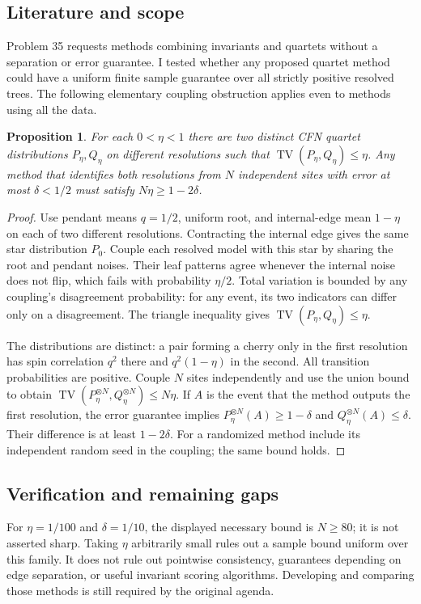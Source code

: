 \documentclass[11pt]{article}
\newtheorem{proposition}{Proposition}
\begin{document}
\subsection{Literature and scope}
Problem 35 requests methods combining invariants and quartets without a separation or error guarantee. I tested whether any proposed quartet method could have a uniform finite sample guarantee over all strictly positive resolved trees. The following elementary coupling obstruction applies even to methods using all the data.
\begin{proposition}
For each $0<\eta<1$ there are two distinct CFN quartet distributions $P_\eta,Q_\eta$ on different resolutions such that $\operatorname{TV}(P_\eta,Q_\eta)\le\eta$. Any method that identifies both resolutions from $N$ independent sites with error at most $\delta<1/2$ must satisfy $N\eta\ge1-2\delta$.
\end{proposition}
\begin{proof}
Use pendant means $q=1/2$, uniform root, and internal-edge mean $1-\eta$ on each of two different resolutions. Contracting the internal edge gives the same star distribution $P_0$. Couple each resolved model with this star by sharing the root and pendant noises. Their leaf patterns agree whenever the internal noise does not flip, which fails with probability $\eta/2$. Total variation is bounded by any coupling's disagreement probability: for any event, its two indicators can differ only on a disagreement. The triangle inequality gives $\operatorname{TV}(P_\eta,Q_\eta)\le\eta$.

The distributions are distinct: a pair forming a cherry only in the first resolution has spin correlation $q^2$ there and $q^2(1-\eta)$ in the second. All transition probabilities are positive. Couple $N$ sites independently and use the union bound to obtain $\operatorname{TV}(P_\eta^{\otimes N},Q_\eta^{\otimes N})\le N\eta$. If $A$ is the event that the method outputs the first resolution, the error guarantee implies $P_\eta^{\otimes N}(A)\ge1-\delta$ and $Q_\eta^{\otimes N}(A)\le\delta$. Their difference is at least $1-2\delta$. For a randomized method include its independent random seed in the coupling; the same bound holds.
\end{proof}
\subsection{Verification and remaining gaps}
For $\eta=1/100$ and $\delta=1/10$, the displayed necessary bound is $N\ge80$; it is not asserted sharp. Taking $\eta$ arbitrarily small rules out a sample bound uniform over this family. It does not rule out pointwise consistency, guarantees depending on edge separation, or useful invariant scoring algorithms. Developing and comparing those methods is still required by the original agenda.
\end{document}
